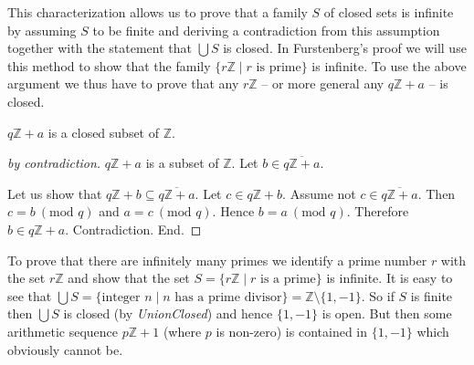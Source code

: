 \documentclass{article}
\renewcommand{\mod}{\text{mod }}
\newcommand{\Int}{\mathbb{Z}}
\begin{document}
  This characterization allows us to prove that a family $S$ of closed sets is infinite by assuming
  $S$ to be finite and deriving a contradiction from this assumption together with the statement
  that $\bigcup S$ is closed. In Furstenberg's proof we will use this method to show that the family
  $\{ r \Int \mid r \text{ is prime} \}$ is infinite. To use the above argument we thus have to
  prove that any $r \Int$ -- or more general any $q \Int + a$ -- is closed.

  \begin{forthel}
    \begin{lemma}\label{ArSeqClosed}
      $q \Int + a$ is a closed subset of $\Int$.
    \end{lemma}
    \begin{proof}[by contradiction]
      $q \Int + a$ is a subset of $\Int$.
      Let $b \in \overline{q \Int + a}$.

      Let us show that $q \Int + b \subseteq \overline{q \Int + a}$.
        Let $c \in q \Int + b$.
        Assume not $c \in \overline{q \Int + a}$.
        Then $c = b ~(\mod q)$ and $a = c ~(\mod q)$.
        Hence $b = a ~(\mod q)$.
        Therefore $b \in q \Int + a$.
        Contradiction.
      End.
    \end{proof}
  \end{forthel}

  To prove that there are infinitely many primes we identify a prime number $r$ with the set
  $r \Int$ and show that the set $S = \{r \Int \mid r \textrm{ is a prime} \}$ is infinite. It is
  easy to see that $\bigcup S = \{ \text{integer } n \mid n \text{ has a prime divisor} \} =
  \Int \setminus \{ 1, -1 \}$. So if $S$ is finite then $\bigcup S$ is closed
  (by \textit{UnionClosed}) and hence $\{ 1, -1 \}$ is open. But then some arithmetic sequence
  $p \Int + 1$ (where $p$ is non-zero) is contained in $\{ 1, -1 \}$ which obviously cannot be.
\end{document}
